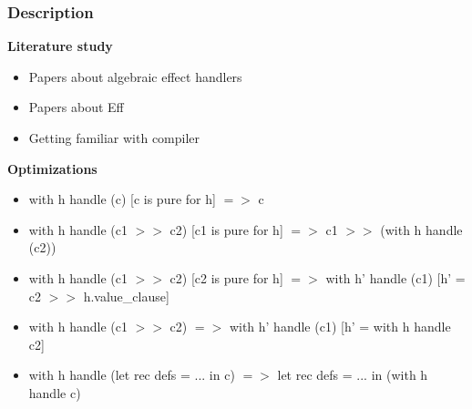 \documentclass{beamer}
\begin{document}
\begin{frame}[fragile]
\frametitle{Description}
\textbf{Literature study}
\begin{itemize}
\item Papers about algebraic effect handlers \cite{monads} \cite{effectsystem} \cite{inferring} \cite{handling}
\item Papers about Eff \cite{introduction}  \cite{programming}
\item Getting familiar with compiler
\end{itemize}

\textbf{Optimizations}
\begin{itemize}
\item with h handle (c) [c is pure for h] $=>$ c
\item with h handle (c1 $>>$ c2) [c1 is pure for h] $=>$ c1 $>>$ (with h handle (c2))
\item with h handle (c1 $>>$ c2) [c2 is pure for h] $=>$ with h' handle (c1) {[h' = c2 $>>$ h.value\_clause]}
\item with h handle (c1 $>>$ c2) $=>$ with h' handle (c1) {[h' = with h handle c2]}
\item with h handle (let rec defs = ... in c) $=>$ let rec defs = ... in (with h handle c)
\end{itemize}
\end{frame}


%
%
\end{document}
